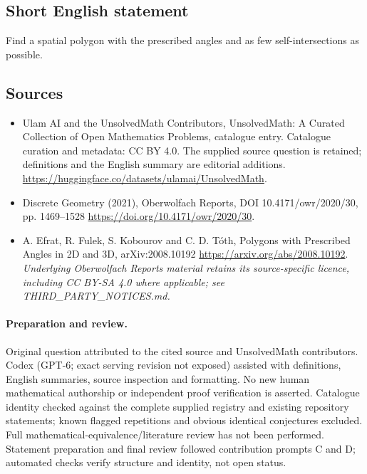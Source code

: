 \documentclass[11pt]{article}
\begin{document}
\subsection{Short English statement}
Find a spatial polygon with the prescribed angles and as few self-intersections as possible.
\subsection{Sources}
\begin{itemize}
\item[\hypertarget{source:statement:1}{S1}] Ulam AI and the UnsolvedMath Contributors, UnsolvedMath: A Curated Collection of Open Mathematics Problems, catalogue entry. Catalogue curation and metadata: CC BY 4.0. The supplied source question is retained; definitions and the English summary are editorial additions.
\url{https://huggingface.co/datasets/ulamai/UnsolvedMath}.
\item[\hypertarget{source:statement:2}{S2}] Discrete Geometry (2021), Oberwolfach Reports, DOI 10.4171/owr/2020/30, pp. 1469--1528
\url{https://doi.org/10.4171/owr/2020/30}.
\item[\hypertarget{source:statement:3}{S3}] A. Efrat, R. Fulek, S. Kobourov and C. D. Tóth, Polygons with Prescribed Angles in 2D and 3D, arXiv:2008.10192
\url{https://arxiv.org/abs/2008.10192}.
\textit{Underlying Oberwolfach Reports material retains its source-specific licence, including CC BY-SA 4.0 where applicable; see THIRD\_PARTY\_NOTICES.md.}
\end{itemize}
\paragraph{Preparation and review.}
Original question attributed to the cited source and UnsolvedMath contributors. Codex (GPT-6; exact serving revision not exposed) assisted with definitions, English summaries, source inspection and formatting. No new human mathematical authorship or independent proof verification is asserted. Catalogue identity checked against the complete supplied registry and existing repository statements; known flagged repetitions and obvious identical conjectures excluded. Full mathematical-equivalence/literature review has not been performed. Statement preparation and final review followed contribution prompts C and D; automated checks verify structure and identity, not open status.
\label{end:statement}
\end{document}
